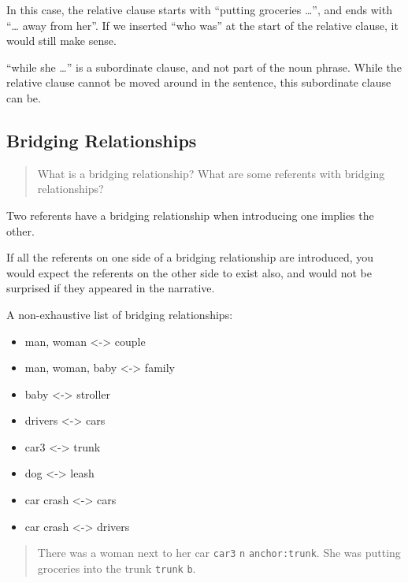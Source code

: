 \documentclass[
]{book}
\providecommand{\tightlist}{%
  \setlength{\itemsep}{0pt}\setlength{\parskip}{0pt}}
\begin{document}
In this case, the relative clause starts with ``putting groceries \ldots{}'',
and ends with ``\ldots{} away from her''.
If we inserted ``who was'' at the start of the relative clause,
it would still make sense.

``while she \ldots{}'' is a subordinate clause, and not part of the noun phrase.
While the relative clause cannot be moved around in the sentence,
this subordinate clause can be.

\hypertarget{bridging-relationships}{%
\subsection{Bridging Relationships}\label{bridging-relationships}}

\begin{quote}
What is a bridging relationship?
What are some referents with bridging relationships?
\end{quote}

Two referents have a bridging relationship
when introducing one implies the other.

If all the referents on one side of a bridging relationship are introduced,
you would expect the referents on the other side to exist also,
and would not be surprised if they appeared in the narrative.

A non-exhaustive list of bridging relationships:

\begin{itemize}
\tightlist
\item
  man, woman \textless-\textgreater{} couple
\item
  man, woman, baby \textless-\textgreater{} family
\item
  baby \textless-\textgreater{} stroller
\item
  drivers \textless-\textgreater{} cars
\item
  car3 \textless-\textgreater{} trunk
\item
  dog \textless-\textgreater{} leash
\item
  car crash \textless-\textgreater{} cars
\item
  car crash \textless-\textgreater{} drivers
\end{itemize}

\begin{quote}
There was a woman next to her car \texttt{car3} \texttt{n} \texttt{anchor:trunk}.
She was putting groceries into the trunk \texttt{trunk} \texttt{b}.
\end{quote}
\end{document}
